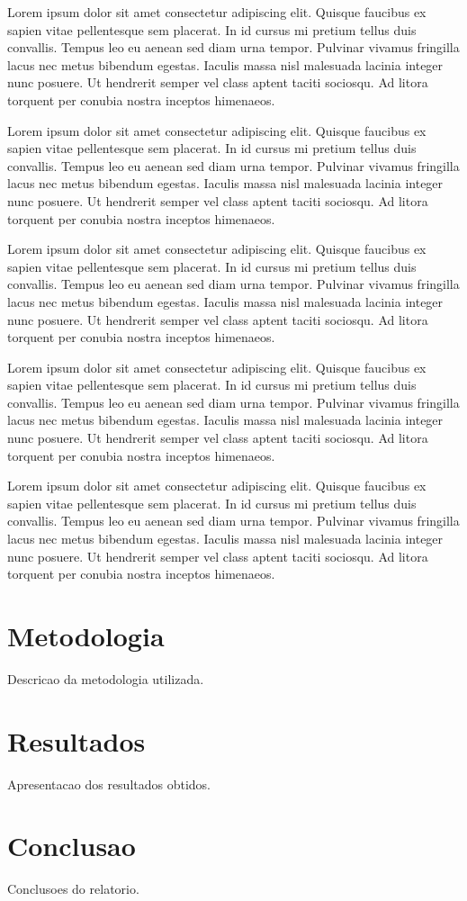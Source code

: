 \documentclass[12pt, a4paper]{article}
\begin{document}
Lorem ipsum dolor sit amet consectetur adipiscing elit. Quisque faucibus ex sapien vitae pellentesque sem placerat. In id cursus mi pretium tellus duis convallis. Tempus leo eu aenean sed diam urna tempor. Pulvinar vivamus fringilla lacus nec metus bibendum egestas. Iaculis massa nisl malesuada lacinia integer nunc posuere. Ut hendrerit semper vel class aptent taciti sociosqu. Ad litora torquent per conubia nostra inceptos himenaeos.

Lorem ipsum dolor sit amet consectetur adipiscing elit. Quisque faucibus ex sapien vitae pellentesque sem placerat. In id cursus mi pretium tellus duis convallis. Tempus leo eu aenean sed diam urna tempor. Pulvinar vivamus fringilla lacus nec metus bibendum egestas. Iaculis massa nisl malesuada lacinia integer nunc posuere. Ut hendrerit semper vel class aptent taciti sociosqu. Ad litora torquent per conubia nostra inceptos himenaeos.

Lorem ipsum dolor sit amet consectetur adipiscing elit. Quisque faucibus ex sapien vitae pellentesque sem placerat. In id cursus mi pretium tellus duis convallis. Tempus leo eu aenean sed diam urna tempor. Pulvinar vivamus fringilla lacus nec metus bibendum egestas. Iaculis massa nisl malesuada lacinia integer nunc posuere. Ut hendrerit semper vel class aptent taciti sociosqu. Ad litora torquent per conubia nostra inceptos himenaeos.

Lorem ipsum dolor sit amet consectetur adipiscing elit. Quisque faucibus ex sapien vitae pellentesque sem placerat. In id cursus mi pretium tellus duis convallis. Tempus leo eu aenean sed diam urna tempor. Pulvinar vivamus fringilla lacus nec metus bibendum egestas. Iaculis massa nisl malesuada lacinia integer nunc posuere. Ut hendrerit semper vel class aptent taciti sociosqu. Ad litora torquent per conubia nostra inceptos himenaeos.

Lorem ipsum dolor sit amet consectetur adipiscing elit. Quisque faucibus ex sapien vitae pellentesque sem placerat. In id cursus mi pretium tellus duis convallis. Tempus leo eu aenean sed diam urna tempor. Pulvinar vivamus fringilla lacus nec metus bibendum egestas. Iaculis massa nisl malesuada lacinia integer nunc posuere. Ut hendrerit semper vel class aptent taciti sociosqu. Ad litora torquent per conubia nostra inceptos himenaeos.
\section{Metodologia}

Descricao da metodologia utilizada.

\section{Resultados}

Apresentacao dos resultados obtidos.

\section{Conclusao}

Conclusoes do relatorio.
\end{document}

